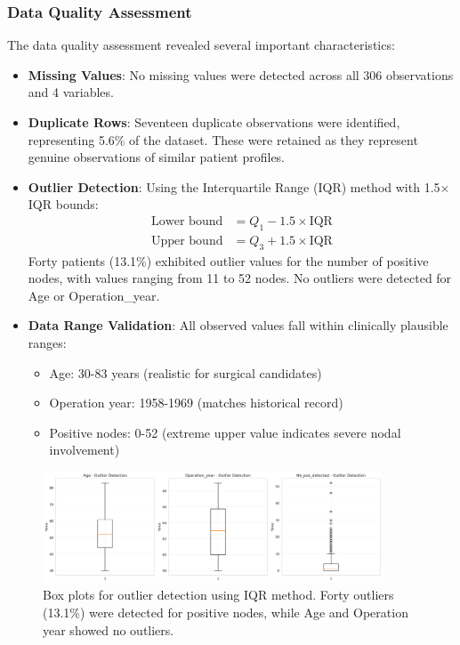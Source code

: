 \documentclass[12pt,a4paper]{article}
\begin{document}
\subsubsection{Data Quality Assessment}

The data quality assessment revealed several important characteristics:

\begin{itemize}
    \item \textbf{Missing Values}: No missing values were detected across all 306 observations and 4 variables.
    
    \item \textbf{Duplicate Rows}: Seventeen duplicate observations were identified, representing 5.6\% of the dataset. These were retained as they represent genuine observations of similar patient profiles.
    
    \item \textbf{Outlier Detection}: Using the Interquartile Range (IQR) method with 1.5× IQR bounds:
    \begin{align*}
    \text{Lower bound} &= Q_1 - 1.5 \times \text{IQR} \\
    \text{Upper bound} &= Q_3 + 1.5 \times \text{IQR}
    \end{align*}
    Forty patients (13.1\%) exhibited outlier values for the number of positive nodes, with values ranging from 11 to 52 nodes. No outliers were detected for Age or Operation\_year.
    
    \item \textbf{Data Range Validation}: All observed values fall within clinically plausible ranges:
    \begin{itemize}
        \item Age: 30-83 years (realistic for surgical candidates)
        \item Operation year: 1958-1969 (matches historical record)
        \item Positive nodes: 0-52 (extreme upper value indicates severe nodal involvement)
    \end{itemize}
\end{itemize}

\begin{figure}[H]
\centering
\includegraphics[width=0.9\textwidth]{outlier_detection_boxplots.png}
\caption{Box plots for outlier detection using IQR method. Forty outliers (13.1\%) were detected for positive nodes, while Age and Operation year showed no outliers.}
\label{fig:outlier_detection}
\end{figure}
\end{document}
